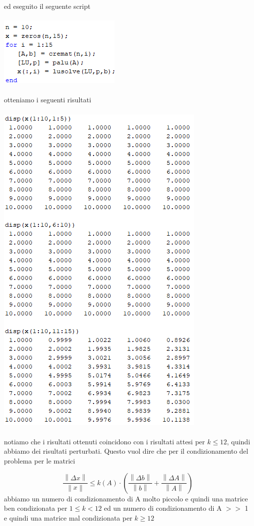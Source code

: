 ed eseguito il seguente script
\\~\\
\includegraphics[width=.5\linewidth]{img/ex10.png}
\\~\\
otteniamo i seguenti risultati
\\~\\
\includegraphics[width=.65\linewidth]{img/tabella10.png}\\~\\
notiamo che i risultati ottenuti coincidono con i risultati attesi per $k \leq 12$, quindi abbiamo dei risultati perturbati.\newline
Questo vuol dire che per il condizionamento del problema per le matrici

\begin{equation}
	\frac{\left \| \Delta x \right \|}{\left \| x \right \|} \leq k(A)\cdot \left ( \frac{\left \| \Delta b \right \|}{\left \| b \right \|} + \frac{\left \| \Delta A \right \|}{\left \| A \right \|}\right )
\end{equation}
abbiamo un numero di condizionamento di A molto piccolo e quindi una matrice ben condizionata per $1 \leq k<12$ ed un numero di condizionamento di A $>>$ 1 e quindi una matrice mal condizionata per $k \geq 12$